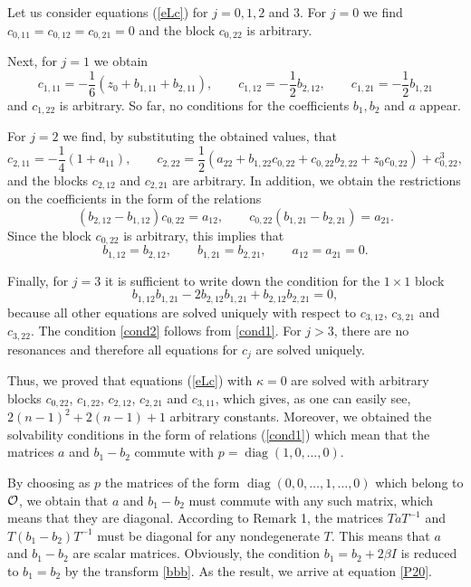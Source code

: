 \documentclass{article}
\theoremstyle{plain}
\theoremstyle{definition}
\DeclareMathOperator{\diag}{diag}
\begin{document}
Let us consider equations (\ref{eLc}) for $j=0,1,2$ and $3$. For $j=0$ we find $c_{0,11}=c_{0,12}=c_{0,21}=0$ and the block $c_{0,22}$ is arbitrary. 

Next, for $j=1$ we obtain
\[
 c_{1,11}=-\frac{1}{6}(z_0+b_{1,11}+b_{2,11}),\qquad
 c_{1,12}=-\frac{1}{2}b_{2,12},\qquad
 c_{1,21}=-\frac{1}{2}b_{1,21}
\]
and $c_{1,22}$ is arbitrary. So far, no conditions for the coefficients $b_1,b_2$ and $a$ appear. 

For $j=2$ we find, by substituting the obtained values, that
\[
 c_{2,11}=-\frac{1}{4}(1+a_{11}),\qquad
 c_{2,22}=\frac{1}{2}(a_{22}+b_{1,22}c_{0,22}+c_{0,22}b_{2,22}+z_0c_{0,22})+c^3_{0,22},
\]
and the blocks $c_{2,12}$ and $c_{2,21}$ are arbitrary. In addition, we obtain the restrictions on the coefficients in the form of the relations
$$
 (b_{2,12}-b_{1,12})c_{0,22}=a_{12},\qquad c_{0,22}(b_{1,21}-b_{2,21})=a_{21}.
$$
Since the block $c_{0,22}$ is arbitrary, this implies that
\begin{equation}\label{cond1}
 b_{1,12}=b_{2,12},\qquad b_{1,21}=b_{2,21},\qquad a_{12}=a_{21}=0.
\end{equation}

Finally, for $j=3$ it is sufficient to write down the condition for the $1\times1$ block
\begin{equation}\label{cond2}
 b_{1,12}b_{1,21}-2b_{2,12}b_{1,21}+b_{2,12}b_{2,21}=0,
\end{equation}
because all other equations are solved uniquely with respect to $c_{3,12}$, $c_{3,21}$ and $c_{3,22}$. The condition \eqref{cond2} follows from \eqref{cond1}. For $j>3$, there are no resonances and therefore all equations for $c_j$ are solved uniquely.

Thus, we proved that equations (\ref{eLc}) with $\kappa=0$ are solved with arbitrary blocks $c_{0,22}$, $c_{1,22}$, $c_{2,12}$, $c_{2,21}$ and $c_{3,11}$, which gives, as one can easily see, $2(n-1)^2+2(n-1)+1$ arbitrary constants. Moreover, we obtained the solvability conditions in the form of relations (\ref{cond1}) which mean that the matrices $a$ and $b_1-b_2$ commute with $p=\diag(1,0,\dots,0)$.    

By choosing as $p$ the matrices of the form $\diag(0,0,\dots, 1, \dots,0)$ which belong to $\cal O$, we obtain that $a$ and $b_1-b_2$ must commute with any such matrix, which means that they are diagonal. According to Remark 1, the matrices $T a T^{-1}$ and $T (b_1-b_2) T^{-1}$ must be diagonal for any nondegenerate $T$. This means that $a$ and $b_1-b_2$ are scalar matrices. Obviously, the condition $b_1=b_2+2\beta I$ is reduced to $b_1=b_2$ by the transform \eqref{bbb}. As the result, we arrive at equation \ref{P20}.
\end{document}
